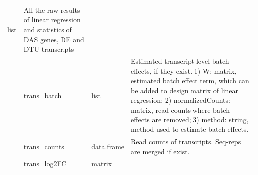 \documentclass[]{article}
\begin{document}
\begin{longtable}[]{@{}llll@{}}
\begin{minipage}[t]{0.04\columnwidth}
list\strut
\end{minipage} & \begin{minipage}[t]{0.71\columnwidth}\raggedright\strut
All the raw results of linear regression and statistics of DAS genes, DE
and DTU transcripts\strut
\end{minipage}\tabularnewline
\begin{minipage}[t]{0.08\columnwidth}\raggedright\strut
\strut
\end{minipage} & \begin{minipage}[t]{0.06\columnwidth}\raggedright\strut
trans\_batch\strut
\end{minipage} & \begin{minipage}[t]{0.04\columnwidth}\raggedright\strut
list\strut
\end{minipage} & \begin{minipage}[t]{0.71\columnwidth}\raggedright\strut
Estimated transcript level batch effects, if they exist. 1) W: matrix,
estimated batch effect term, which can be added to design matrix of
linear regression; 2) normalizedCounts: matrix, read counts where batch
effects are removed; 3) method: string, method used to estimate batch
effects.\strut
\end{minipage}\tabularnewline
\begin{minipage}[t]{0.08\columnwidth}\raggedright\strut
\strut
\end{minipage} & \begin{minipage}[t]{0.06\columnwidth}\raggedright\strut
trans\_counts\strut
\end{minipage} & \begin{minipage}[t]{0.04\columnwidth}\raggedright\strut
data.frame\strut
\end{minipage} & \begin{minipage}[t]{0.71\columnwidth}\raggedright\strut
Read counts of transcripts. Seq-reps are merged if exist.\strut
\end{minipage}\tabularnewline
\begin{minipage}[t]{0.08\columnwidth}\raggedright\strut
\strut
\end{minipage} & \begin{minipage}[t]{0.06\columnwidth}\raggedright\strut
trans\_log2FC\strut
\end{minipage} & \begin{minipage}[t]{0.04\columnwidth}\raggedright\strut
matrix\strut
\end{minipage} & \begin{minipage}[t]{0.71\columnwidth}\raggedright\strut

\end{minipage}
\end{longtable}
\end{document}
